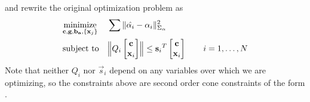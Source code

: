 and rewrite the original optimization problem as
\begin{equation}
  \begin{aligned}
    & \underset{\AllVars}{\text{minimize}}
    & & \sum \| \hat{\Accel_i} - \Accel_i \|_{\AccelCov}^2 \\
    & \text{subject to}
    & &
    \Bigl\| Q_i \begin{bmatrix}\Controls\\\Landmark_i\end{bmatrix} \Bigr\| \leq
    {\vec{s}_i}^T \begin{bmatrix}\Controls\\\Landmark_i\end{bmatrix}
    ~~~~~~
    i = 1,\ldots,N
  \end{aligned}
  \label{first-transform}
\end{equation}
Note that neither $Q_i$ nor $\vec{s}_i$ depend on any variables over
which we are optimizing, so the constraints above are second order
cone constraints of the form .


